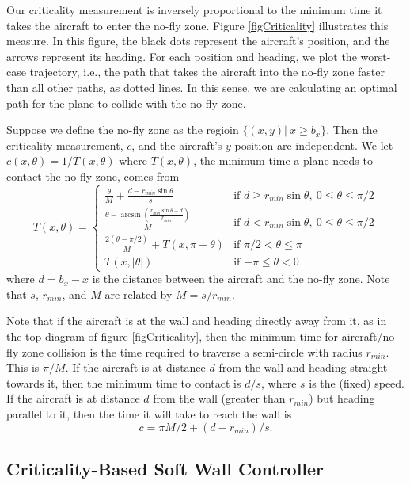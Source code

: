 \documentclass[11pt]{article}
\begin{document}
Our criticality measurement is inversely proportional to the minimum
time it takes the aircraft to enter the no-fly zone.  Figure
\ref{figCriticality} illustrates this measure.  In this figure, the
black dots represent the aircraft's position, and the arrows represent
its heading. For each position and heading, we plot the worst-case
trajectory, i.e., the path that takes the aircraft into the
no-fly zone faster than all other paths, as dotted lines.  In this
sense, we are calculating an optimal path for the plane to collide with
the no-fly zone.

Suppose we define the no-fly zone as the regioin $\{(x,y)|\ x \geq b_{x}\}$. Then the
criticality measurement, $c$, and the aircraft's $y$-position are
independent. We let  $c(x, \theta) = 1 / T(x, \theta)$ where
$T(x, \theta)$, the minimum time a plane needs to contact the no-fly
zone, comes from
\[
T(x, \theta) = \left\{ \begin{array}{ll}
\frac{\theta}{M} + \frac{d - r_{min}\sin{\theta}}{s} & \mbox{if $d \geq r_{min}\sin{\theta},\ 0 \leq \theta \leq \pi/2$} \\
\frac{\theta - \arcsin{\left( \frac{r_{min}\sin{\theta}- d}{r_{min}}\right) }}{M} & \mbox{if $d < r_{min}\sin{\theta},\ 0 \leq \theta \leq \pi/2$} \\
\frac{2(\theta - \pi/2)}{M} + T(x, \pi - \theta) & \mbox{if $\pi/2 < \theta \leq \pi$} \\
T(x, |\theta|) & \mbox{if $-\pi \leq \theta < 0$}
\end{array}
\right.
\]
where $d = b_{x} - x$ is the distance between the aircraft and the no-fly zone.
Note that $s$, $r_{min}$, and $M$ are related by $M = s/r_{min}$.

Note that if the aircraft is at the wall and heading directly away
from it, as in the top diagram of figure \ref{figCriticality}, then
the minimum time for aircraft/no-fly zone collision is the time
required to traverse a semi-circle with radius $r_{min}$.  This is
$\pi/M$.  If the aircraft is at distance $d$ from the wall and heading
straight towards it, then the minimum time to contact is $d/s$, where
$s$ is the (fixed) speed.  If the aircraft is at distance $d$ from the
wall (greater than $r_{min}$) but heading parallel to it, then the
time it will take to reach the wall is
\[
c = \pi M/2+(d-r_{min})/s .
\]


\subsection{Criticality-Based Soft Wall Controller}
\end{document}
